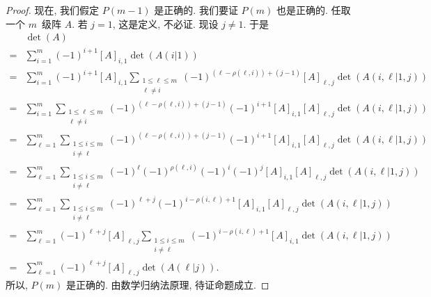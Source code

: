 \documentclass[%
    UTF8,%
    fontset=none,%
    punct=kaiming,%
    zihao=-4,%
    a4paper,%
    oneside,%
]{ctexbook}
\renewcommand*{\leq}{\leqslant}
\begin{document}
\begin{proof}
    现在, 我们假定 \(P(m-1)\) 是正确的.
    我们要证 \(P(m)\) 也是正确的.
    任取一个 \(m\)~级阵 \(A\).
    若 \(j = 1\), 这是定义, 不必证.
    现设 \(j \neq 1\).
    于是
    \begin{align*}
             & \det {(A)}                  \\
        = {} &
        \sum_{i = 1}^{m} {
        (-1)^{i+1} [A]_{i,1} \det {(A(i|1))}
        }
        \tag*{(1)}
        \\
        = {} &
        \sum_{i = 1}^{m} {
        (-1)^{i+1} [A]_{i,1}
        \sum_{\substack{1 \leq \ell \leq m \\ \ell \neq i}} {
        (-1)^{(\ell - \rho(\ell, i)) + (j - 1)}
            [A]_{\ell,j} \det {(A({i,\ell}|{1,j}))}
        }
        }
        \tag*{(2)}
        \\
        = {} &
        \sum_{i = 1}^{m} {
        \sum_{\substack{1 \leq \ell \leq m \\ \ell \neq i}} {
        (-1)^{(\ell - \rho(\ell, i)) + (j - 1)}
        (-1)^{i+1}
            [A]_{i,1} [A]_{\ell,j} \det {(A({i,\ell}|{1,j}))}
        }
        }
        \tag*{(3)}
        \\
        = {} &
        \sum_{\ell = 1}^{m} {
        \sum_{\substack{1 \leq i \leq m    \\ i \neq \ell}} {
        (-1)^{(\ell - \rho(\ell, i)) + (j - 1)}
        (-1)^{i+1}
            [A]_{i,1} [A]_{\ell,j} \det {(A({i,\ell}|{1,j}))}
        }
        }
        \tag*{(4)}
        \\
        = {} &
        \sum_{\ell = 1}^{m} {
        \sum_{\substack{1 \leq i \leq m    \\ i \neq \ell}} {
        (-1)^{\ell} (-1)^{\rho(\ell, i)} (-1)^{i} (-1)^{j}
            [A]_{i,1} [A]_{\ell,j} \det {(A({i,\ell}|{1,j}))}
        }
        }
        \tag*{(5)}
        \\
        = {} &
        \sum_{\ell = 1}^{m} {
        \sum_{\substack{1 \leq i \leq m    \\ i \neq \ell}} {
        (-1)^{\ell + j} (-1)^{i - \rho(i, \ell) + 1}
            [A]_{i,1} [A]_{\ell,j} \det {(A({i,\ell}|{1,j}))}
        }
        }
        \tag*{(6)}
        \\
        = {} &
        \sum_{\ell = 1}^{m} {(-1)^{\ell + j} [A]_{\ell,j}
        \sum_{\substack{1 \leq i \leq m    \\ i \neq \ell}} {
        (-1)^{i - \rho(i, \ell) + 1}
            [A]_{i,1} \det {(A({i,\ell}|{1,j}))}
        }
        }
        \tag*{(7)}
        \\
        = {} &
        \sum_{\ell = 1}^{m} {(-1)^{\ell + j} [A]_{\ell,j}
        \det {(A(\ell|j))}
        }.
        \tag*{(8)}
    \end{align*}
    所以, \(P(m)\) 是正确的.
    由数学归纳法原理, 待证命题成立.


\end{proof}
\end{document}
